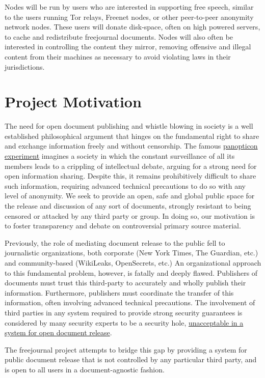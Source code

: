 \documentclass[letterpaper,10pt,oneside]{sphinxmanual}
\begin{document}
Nodes will be run by users who are interested in supporting free speech, similar to the users running Tor relays, Freenet nodes,
or other peer-to-peer anonymity network nodes.  These users will donate disk-space, often on high powered servers, to cache
and redistribute freejournal documents.  Nodes will also often be interested in controlling the content they mirror, removing
offensive and illegal content from their machines as necessary to avoid violating laws in their jurisdictions.


\section{Project Motivation}
\label{design:project-motivation}
The need for open document publishing and whistle blowing in society is a well established philosophical argument that hinges on
the fundamental right to share and exchange information freely and without censorship.  The famous \href{https://en.wikipedia.org/wiki/Panopticon}{panopticon experiment} imagines a society in which the constant surveillance of all its members leads to a
crippling of intellectual debate, arguing for a strong need for open information sharing.  Despite this, it remains
prohibitively difficult to share such information, requiring advanced technical precautions to do so with any level of
anonymity.  We seek to provide an open, safe and global public space for the release and discussion of any sort of documents,
strongly resistant to being censored or attacked by any third party or group.  In doing so, our motivation is to foster
transparency and debate on controversial primary source material.

Previously, the role of mediating document release to the public fell to journalistic organizations, both corporate (New York
Times, The Guardian, etc.) and community-based (WikiLeaks, OpenSecrets, etc.)  An organizational approach to this fundamental
problem, however, is fatally and deeply flawed.  Publishers of documents must trust this third-party to accurately and wholly
publish their information.  Furthermore, publishers must coordinate the transfer of this information, often involving advanced
technical precautions.  The involvement of third parties in any system required to provide strong security guarantees is
considered by many security experts to be a security hole, \href{http://szabo.best.vwh.net/ttps.html}{unacceptable in a system for open document release}.

The freejournal project attempts to bridge this gap by providing a system for public document release that is not controlled
by any particular third party, and is open to all users in a document-agnostic fashion.
\end{document}
